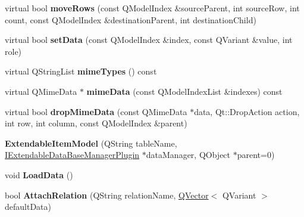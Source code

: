 \begin{DoxyCompactItemize}
\item 
virtual bool {\bfseries move\+Rows} (const Q\+Model\+Index \&source\+Parent, int source\+Row, int count, const Q\+Model\+Index \&destination\+Parent, int destination\+Child)\hypertarget{class_extendable_item_model_a7d00afeac188e21c0d165b14a3c421cd}{}\label{class_extendable_item_model_a7d00afeac188e21c0d165b14a3c421cd}

\item 
virtual bool {\bfseries set\+Data} (const Q\+Model\+Index \&index, const Q\+Variant \&value, int role)\hypertarget{class_extendable_item_model_a72c65abf36fbe31778e73c983da260cc}{}\label{class_extendable_item_model_a72c65abf36fbe31778e73c983da260cc}

\item 
virtual Q\+String\+List {\bfseries mime\+Types} () const \hypertarget{class_extendable_item_model_a886feb9533a3fb923d957d86db04c73a}{}\label{class_extendable_item_model_a886feb9533a3fb923d957d86db04c73a}

\item 
virtual Q\+Mime\+Data $\ast$ {\bfseries mime\+Data} (const Q\+Model\+Index\+List \&indexes) const \hypertarget{class_extendable_item_model_a98c7fabbfb3296b6fa60531dded4a33c}{}\label{class_extendable_item_model_a98c7fabbfb3296b6fa60531dded4a33c}

\item 
virtual bool {\bfseries drop\+Mime\+Data} (const Q\+Mime\+Data $\ast$data, Qt\+::\+Drop\+Action action, int row, int column, const Q\+Model\+Index \&parent)\hypertarget{class_extendable_item_model_ae6dc27740bcfff8ecd88e3af76f7d3ac}{}\label{class_extendable_item_model_ae6dc27740bcfff8ecd88e3af76f7d3ac}

\item 
{\bfseries Extendable\+Item\+Model} (Q\+String table\+Name, \hyperlink{class_i_extendable_data_base_manager_plugin}{I\+Extendable\+Data\+Base\+Manager\+Plugin} $\ast$data\+Manager, Q\+Object $\ast$parent=0)\hypertarget{class_extendable_item_model_a896f75df752535510036e0c5d42fac8a}{}\label{class_extendable_item_model_a896f75df752535510036e0c5d42fac8a}

\item 
void {\bfseries Load\+Data} ()\hypertarget{class_extendable_item_model_ae5887f5d5086a094d712e2f7a1f6b84b}{}\label{class_extendable_item_model_ae5887f5d5086a094d712e2f7a1f6b84b}

\item 
bool {\bfseries Attach\+Relation} (Q\+String relation\+Name, \hyperlink{class_q_vector}{Q\+Vector}$<$ Q\+Variant $>$ default\+Data)\hypertarget{class_extendable_item_model_a49139d270880dc35b44b51bd95a36e89}{}\label{class_extendable_item_model_a49139d270880dc35b44b51bd95a36e89}


\end{DoxyCompactItemize}
